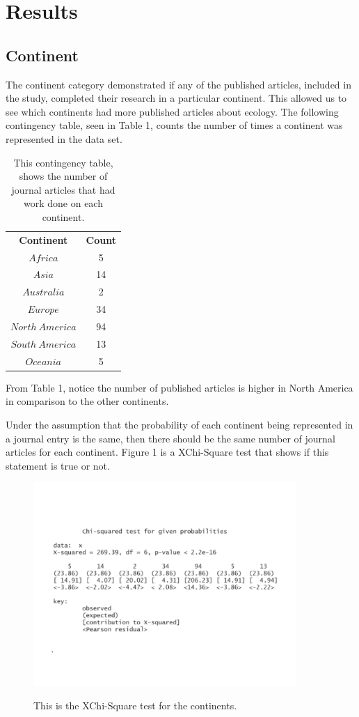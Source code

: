 \documentclass[12pt, letterpaper]{article}
\begin{document}
\section{Results}
\subsection{Continent}
The continent category demonstrated if any of the published articles, included in the study, completed their research in a particular continent. This allowed us to see which continents had more published articles about ecology. The following contingency table, seen in Table 1, counts the number of times a continent was represented in the data set.
\begin{table}[!h]
\begin{center}
\begin{tabular}{|c|c|}
\textbf{Continent} & \textbf{Count}\\
$Africa$ & 5\\
$Asia$ &  14\\
$Australia$ &  2\\
$Europe$ & 34\\
$North\ America$ & 94\\
$South\ America$ & 13\\
$Oceania$ & 5\\
\end{tabular}
\end{center}
\caption{This contingency table, shows the number of journal articles that had work done on each continent.}
\label{fig: Continent Contingency Table}
\end{table}
From Table 1, notice the number of published articles is higher in North America in comparison to the other continents.

Under the assumption that the probability of each continent being represented in a journal entry is the same, then there should be the same number of journal articles for each continent. Figure 1 is a XChi-Square test that shows if this statement is true or not. 

\begin{figure}[!h]
\begin{center}
\includegraphics[width=10cm]{ContinentChiSqaure1.pdf}
\label{fig: Continent XChi-Square}
\caption{This is the XChi-Square test for the continents.}
\end{center}
\end{figure}
\end{document}
